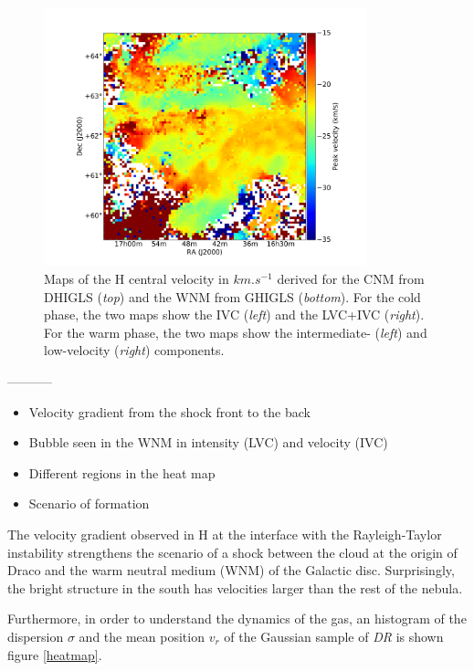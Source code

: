 \documentclass[traditabstract]{aa}
\begin{document}
\begin{figure}[h]
  \includegraphics[page=5,height=7.5cm,trim=110 30 130 75,clip=true]{Figures/GHIGLS_velo.pdf}
  \caption{\label{velo_HI} Maps of the H central velocity in $km.s^{-1}$ derived for the CNM from DHIGLS (\emph{top}) and the WNM from GHIGLS (\emph{bottom}). For the cold phase, the two maps show the IVC (\emph{left}) and the LVC+IVC (\emph{right}). For the warm phase, the two maps show the intermediate- (\emph{left}) and low-velocity (\emph{right}) components.}
\end{figure}

-----------

\begin{itemize}
  \item Velocity gradient from the shock front to the back
  \item Bubble seen in the WNM in intensity (LVC) and velocity (IVC)
  \item Different regions in the heat map
  \item Scenario of formation
\end{itemize}

    The velocity gradient observed in H at the interface  with the Rayleigh-Taylor instability strengthens the scenario of a shock between the cloud at the origin of Draco and the warm neutral 
 medium (WNM) of the Galactic disc. Surprisingly, the bright structure in the south has velocities larger than the rest of the nebula.

Furthermore, in order to understand the dynamics of the gas, an histogram of the 
dispersion $\sigma$ and the mean position $v_{r}$ of the Gaussian sample of \textit{DR} is shown figure \ref{heatmap}.

\end{document}

